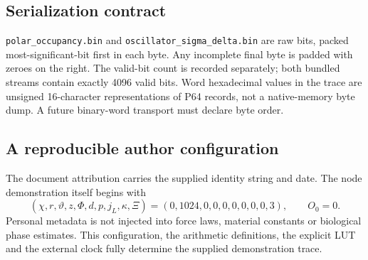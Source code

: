 \documentclass[11pt,a4paper]{article}
\newcommand{\onepage}{\clearpage}
\numberwithin{equation}{section}
\begin{document}
\subsection{Serialization contract}
\texttt{polar\_occupancy.bin} and \texttt{oscillator\_sigma\_delta.bin} are raw bits, packed most-significant-bit first in each byte. Any incomplete final byte is padded with zeroes on the right. The valid-bit count is recorded separately; both bundled streams contain exactly 4096 valid bits. Word hexadecimal values in the trace are unsigned 16-character representations of P64 records, not a native-memory byte dump. A future binary-word transport must declare byte order.

\subsection{A reproducible author configuration}
The document attribution carries the supplied identity string and date. The node demonstration itself begins with
\begin{equation}
(\chi,r,\vartheta,z,\Phi,d,p,j_L,\kappa,\Xi)
=(0,1024,0,0,0,0,0,0,0,3),\qquad O_0=0.
\end{equation}
Personal metadata is not injected into force laws, material constants or biological phase estimates. This configuration, the arithmetic definitions, the explicit LUT and the external clock fully determine the supplied demonstration trace.

\onepage
\end{document}
